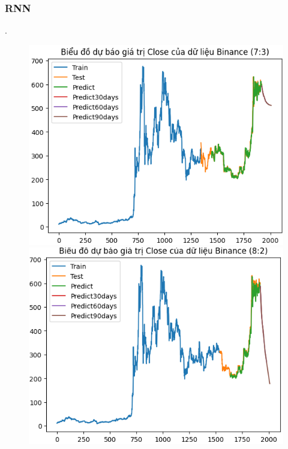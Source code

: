 \documentclass[conference]{IEEEtran}
\begin{document}
	\subsubsection{RNN}.
	\begin{figure}[H]
		\centering
		\begin{minipage}{0.15\textwidth}
			\centering
			\includegraphics[width=1\textwidth]{Figure/RNN_BNB73.png}
		\end{minipage}
		\hfill
		\begin{minipage}{0.15\textwidth}
			\centering
			\includegraphics[width=1\textwidth]{Figure/RNN_BNB82.png}
		\end{minipage}

\end{figure}
\end{document}
